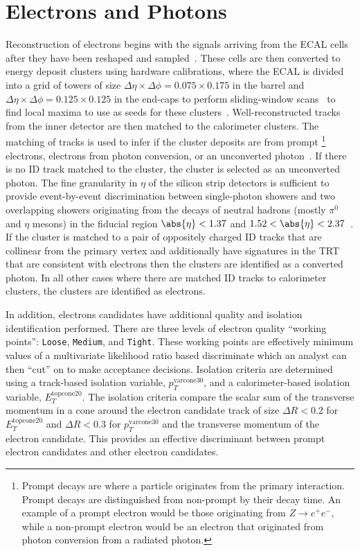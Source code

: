 \section{Electrons and Photons}\label{section:e_gamma}

Reconstruction of electrons begins with the signals arriving from the ECAL cells after they have been reshaped and sampled~\cite{PERF-2013-05}.
These cells are then converted to energy deposit clusters using hardware calibrations, where the ECAL is divided into a grid of towers of size $\Delta \eta \times \Delta \phi = 0.075 \times 0.175$ in the barrel and $\Delta \eta \times \Delta \phi = 0.125 \times 0.125$ in the end-caps to perform sliding-window scans~\cite{Lampl:1099735} to find local maxima to use as seeds for these clusters~\cite{PERF-2013-05}.
Well-reconstructed tracks from the \gls{inner detector} are then matched to the calorimeter clusters.
The matching of tracks is used to infer if the cluster deposits are from prompt%
\footnote{Prompt decays are where a particle originates from the primary interaction.
Prompt decays are distinguished from non-prompt by their decay time.
An example of a prompt electron would be those originating from $Z\to e^{+}e^{-}$, while a non-prompt electron would be an electron that originated from photon conversion from a radiated photon.}
electrons, electrons from photon conversion, or an unconverted photon~\cite{PERF-2013-05,PERF-2016-01}.
If there is no ID track matched to the cluster, the cluster is selected as an unconverted photon.
The fine granularity in $\eta$ of the silicon strip detectors is sufficient to provide event-by-event discrimination between single-photon showers and two overlapping showers originating from the decays of neutral hadrons (mostly $\pi^{0}$ and $\eta$ mesons) in the fiducial region $\abs{\eta} < 1.37$ and $1.52 < \abs{\eta} < 2.37$~\cite{PERF-2017-02}.
If the cluster is matched to a pair of oppositely charged ID tracks that are collinear from the primary vertex and additionally have signatures in the TRT that are consistent with electrons then the clusters are identified as a converted photon.
In all other cases where there are matched ID tracks to calorimeter clusters, the clusters are identified as electrons.

In addition, electrons candidates have additional quality and isolation identification performed.
There are three levels of electron quality ``working points'': \texttt{Loose}, \texttt{Medium}, and \texttt{Tight}.
These working points are effectively minimum values of a multivariate likelihood ratio based discriminate which an analyst can then ``cut'' on to make acceptance decisions.
Isolation criteria are determined using a track-based isolation variable, $p_{T}^{\mathrm{varcone30}}$, and a calorimeter-based isolation variable, $E_{T}^{\mathrm{topcone20}}$.
The isolation criteria compare the scalar sum of the transverse momentum in a cone around the electron candidate track of size $\Delta R < 0.2$ for $E_{T}^{\mathrm{topcone20}}$ and $\Delta R < 0.3$ for $p_{T}^{\mathrm{varcone30}}$ and the transverse momentum of the electron candidate.
This provides an effective discriminant between prompt electron candidates and other electron candidates.

